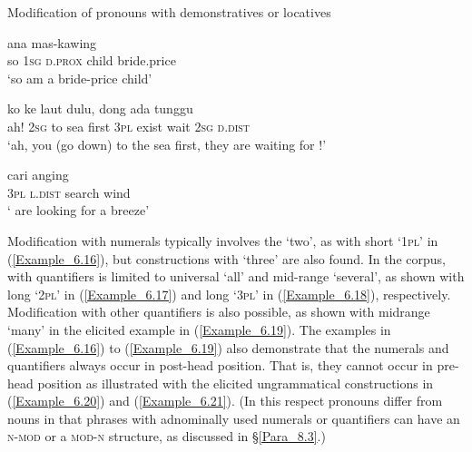 \begin{styleExampleTitle}
Modification of pronouns with demonstratives or locatives
\end{styleExampleTitle}

\ea
\label{Example_6.13}
 {} {} {ana} {mas-kawing}\\ %
 so  \textsc{1sg}  \textsc{d.prox}  child  bride.price\\

\glt
‘so \bluebold{)} am a bride-price child’ \textstyleExampleSource{[081006-028-CvEx.0016]}
\z

\ea
\label{Example_6.14}
 {ko} {ke} {laut} {dulu,} {dong} {ada} {tunggu} {} {}\\ %
 ah!  \textsc{2sg}  to  sea  first  \textsc{3pl}  exist  wait  \textsc{2sg}  \textsc{d.dist}\\

\glt
‘ah, you (go down) to the sea first, they are waiting for \bluebold{)}!’ \textstyleExampleSource{[081015-003-Cv.0003]}
\z

\ea
\label{Example_6.15}
 {} {cari} {anging}\\ %
 \textsc{3pl}  \textsc{l.dist}  search  wind\\

\glt
‘ are looking for a breeze’ \textstyleExampleSource{[081025-009b-Cv.0076]}
\z



Modification with numerals typically involves the   ‘two’, as with short  ‘\textsc{1pl}’ in (\ref{Example_6.16}), but constructions with  ‘three’ are also found. In the corpus,  with quantifiers is limited to universal  ‘all’ and mid-range  ‘several’, as shown with long  ‘\textsc{2pl}’ in (\ref{Example_6.17}) and long  ‘\textsc{3pl}’ in (\ref{Example_6.18}), respectively. Modification with other quantifiers is also possible, as shown with midrange  ‘many’ in the elicited example in (\ref{Example_6.19}). The examples in (\ref{Example_6.16}) to (\ref{Example_6.19}) also demonstrate that the numerals and quantifiers always occur in post-head position. That is, they cannot occur in pre-head position as illustrated with the elicited ungrammatical constructions in (\ref{Example_6.20}) and (\ref{Example_6.21}). (In this respect pronouns differ from nouns in that  phrases with adnominally used numerals or quantifiers can have an \textsc{n-mod} or a \textsc{mod-n} structure, as discussed in §\ref{Para_8.3}.)




